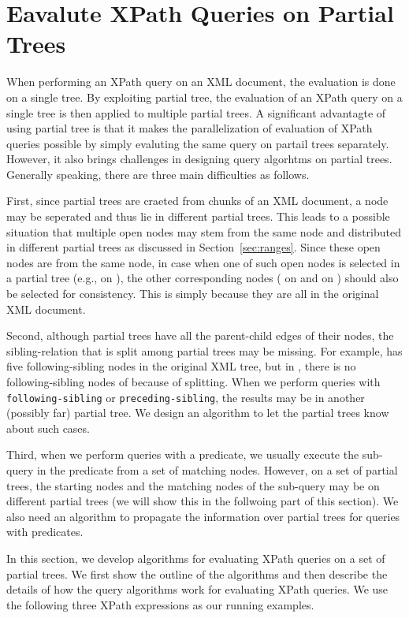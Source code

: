 \section{Eavalute XPath Queries on Partial Trees}
\label{sec:queryalgo}

When performing an XPath query on an XML document, the evaluation is done on a
single tree. By exploiting partial tree, the evaluation of an XPath query on a
single tree is then applied to multiple partial trees. A significant advantagte
of using partial tree is that it makes the parallelization of evaluation of
XPath queries possible by simply evaluting the same query on partail trees
separately. However, it also brings challenges in designing query algorhtms on
partial trees. Generally speaking, there are three main difficulties as follows.

First, since partial trees are craeted from chunks of an XML document, a node
may be seperated and thus lie in different partial trees. This leads to a
possible situation that multiple open nodes may stem from the same node and
distributed in different partial trees as discussed in Section~\ref{sec:ranges}.
Since these open nodes are from the same node, in case when one of such open
nodes is selected in a partial tree (e.g.,  on ), the other
corresponding nodes ( on  and  on ) should also be
selected for consistency. This is simply because they are all  in the
original XML document.

Second, although partial trees have all the parent-child edges of their nodes,
the sibling-relation that is split among partial trees may be missing. For
example,   has five following-sibling nodes in the original XML tree,
but in , there is no following-sibling nodes of  because of
splitting. When we perform queries with \texttt{following-sibling} or
\texttt{preceding-sibling}, the results may be in another (possibly far) partial
tree. We  design an algorithm to let the partial trees know about such cases.

Third, when we perform queries with a predicate, we usually execute the
sub-query in the predicate from a set of matching nodes.  However, on a set of
partial trees, the starting nodes and the matching nodes of the sub-query may be
on different partial trees (we will show this in the follwoing part of this
section). We also need an algorithm to propagate the information over partial
trees for queries with predicates.

In this section, we develop algorithms for evaluating XPath queries on a set of
partial trees. We first show the outline of the algorithms and then describe the
details of how the query algorithms work for evaluating XPath queries. We use
the following three XPath expressions as our running examples.

